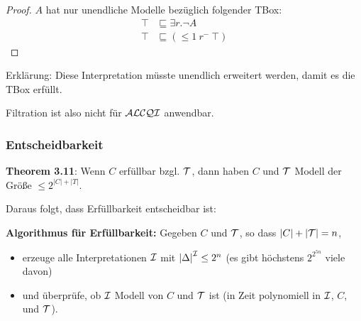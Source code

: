 \begin{proof}
    $A$ hat nur unendliche Modelle bezüglich folgender TBox:
    \begin{align*}
        \top &\sqsubseteq \exists r.\neg A\\
        \top &\sqsubseteq ( \leq 1\ r^{-}\ \top)
    \end{align*}
\end{proof}
\begin{tafel}\mbox{}

\begin{center}
 \end{center}

Erklärung: Diese Interpretation müsste unendlich erweitert werden, damit es die TBox erfüllt.
\end{tafel}

Filtration ist also nicht für $\mathcal{A}\mathcal{L}\mathcal{C}\mathcal{Q}\mathcal{I}$ anwendbar.

\subsubsection{Entscheidbarkeit}
\textbf{Theorem 3.11}:
Wenn $C$ erfüllbar bzgl. $\mathcal{T}$, dann haben $C$ und $\mathcal{T}$ Modell der
Größe $\leq 2^{\left| C \right| + \left| T \right|}$.

Daraus folgt, dass Erfüllbarkeit entscheidbar ist:

\textbf{Algorithmus für Erfüllbarkeit:}
Gegeben $C$ und $\mathcal{T}$, so dass $|C|+|\mathcal{T}| = n$,
\begin{itemize} 
  \item erzeuge alle Interpretationen $\mathcal{I}$ mit $\left| \Delta \right|^\MI \leq 2^{n}$ (es gibt höchstens $2^{2^{5n}}$ viele davon) 
  \item und überprüfe, ob $\mathcal{I}$ Modell von $C$ und $\mathcal{T}$ ist (in Zeit polynomiell in $\mathcal{I}$, $C$, und $\mathcal{T}$).
\end{itemize}

